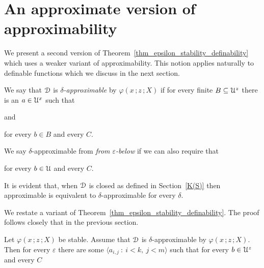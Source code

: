 \section{An approximate version of approximability}

We present a second version of Theorem~\ref{thm_epsilon_stability_definability} which uses a weaker variant of approximability.
This notion applies naturally to definable functions which we discuss in the next section.

\begin{definition}\label{def_approx_X}\strut
  We say that ${\EuScript D}$ is \emph{$\delta$-approximable\/} by $\varphi(x\,;z\,;X)$ if for every finite $B\subseteq{\EuScript U}^z$ there is an $a\in{\EuScript U}^x$ such that\smallskip

  \quad and\smallskip

  \hfill for every $b\in B$ and every $C$.\smallskip

   We say  $\delta$-approximable from \emph{from $\varepsilon$-below\/} if we can also require that\smallskip

  \hfill for every $b\in{\EuScript U}$ and every $C$.

\end{definition}
It is evident that, when ${\EuScript D}$ is closed as defined in Section~\ref{K(S)} then approximable is equivalent to $\delta$-approximable for every $\delta$.

 We restate a variant of Theorem~\ref{thm_epsilon_stability_definability}.
 The proof follows closely that in the previous section.

\begin{theorem}\label{thm_epsilon_delta_stability_definability}
  Let $\varphi(x\,;z\,;X)$ be stable.
  Assume that ${\EuScript D}$ is $\delta$-approximable by $\varphi(x\,;z\,;X)$.
  Then for every $\varepsilon$ there are some $\langle a_{i,j}\ :\ i< k,\ j<m\rangle$ such that for every $b\in{\EuScript U}^z$ and every $C$\medskip

  \medskip

\end{theorem}

